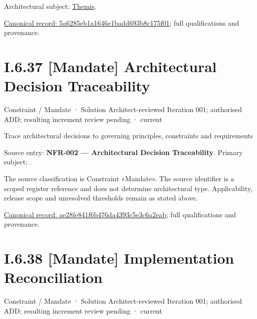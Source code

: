 Architectural subject: \hyperref[element:899d34ec491948b68aad09e507dea6d1]{Themis}.


{\footnotesize \href{../../../../continuum/motivation/constraint/5a6285eb1a1646e1badd693b8c175f01.md}{Canonical record: 5a6285eb1a1646e1badd693b8c175f01}; full qualifications and provenance.}\par
\section*{I.6.37 [Mandate] Architectural Decision Traceability}
\label{navigation:I.6.37}

\label{element:ae28fe841f6b476da4393c5e3c6a2eab}
{\small Constraint / Mandate · Solution Architect-reviewed Iteration 001; authorised ADD; resulting increment review pending · current}\par

Trace architectural decisions to governing principles, constraints and requirements



Source entry: \textbf{NFR-002 — Architectural Decision Traceability}. Primary subject: \texttt{}.



The source classification is Constraint «Mandate». The source identifier is a scoped register reference and does not determine architectural type. Applicability, release scope and unresolved thresholds remain as stated above.


{\footnotesize \href{../../../../continuum/motivation/constraint/mandate/ae28fe841f6b476da4393c5e3c6a2eab.md}{Canonical record: ae28fe841f6b476da4393c5e3c6a2eab}; full qualifications and provenance.}\par
\section*{I.6.38 [Mandate] Implementation Reconciliation}
\label{navigation:I.6.38}

\label{element:5acccfa8cf634669a26bb31010926720}
{\small Constraint / Mandate · Solution Architect-reviewed Iteration 001; authorised ADD; resulting increment review pending · current}\par

